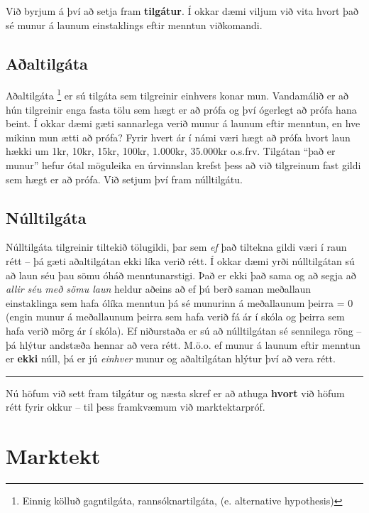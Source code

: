 \documentclass[
]{book}
\theoremstyle{definition}
\theoremstyle{definition}
\theoremstyle{definition}
\theoremstyle{definition}
\theoremstyle{remark}
\begin{document}
Við byrjum á því að setja fram \textbf{tilgátur}. Í okkar dæmi viljum við vita hvort það sé munur á launum einstaklings eftir menntun viðkomandi.

\hypertarget{auxf0altilguxe1ta}{%
\section{Aðaltilgáta}\label{auxf0altilguxe1ta}}

Aðaltilgáta \footnote{Einnig kölluð gagntilgáta, rannsóknartilgáta, (e. alternative hypothesis)} er sú tilgáta sem tilgreinir einhvers konar mun. Vandamálið er að hún tilgreinir enga fasta tölu sem hægt er að prófa og því ógerlegt að prófa hana beint. Í okkar dæmi gæti sannarlega verið munur á launum eftir menntun, en hve mikinn mun ætti að prófa? Fyrir hvert ár í námi væri hægt að prófa hvort laun hækki um 1kr, 10kr, 15kr, 100kr, 1.000kr, 35.000kr o.s.frv. Tilgátan ``það er munur'' hefur ótal möguleika en úrvinnslan krefst þess að við tilgreinum fast gildi sem hægt er að prófa. Við setjum því fram núlltilgátu.

\hypertarget{nuxfalltilguxe1ta}{%
\section{Núlltilgáta}\label{nuxfalltilguxe1ta}}

Núlltilgáta tilgreinir tiltekið tölugildi, þar sem \emph{ef} það tiltekna gildi væri í raun rétt -- þá gæti aðaltilgátan ekki líka verið rétt. Í okkar dæmi yrði núlltilgátan sú að laun séu þau sömu óháð menntunarstigi. Það er ekki það sama og að segja að \emph{allir séu með sömu laun} heldur aðeins að ef þú berð saman meðallaun einstaklinga sem hafa ólíka menntun þá sé munurinn á meðallaunum þeirra = 0 (engin munur á meðallaunum þeirra sem hafa verið fá ár í skóla og þeirra sem hafa verið mörg ár í skóla). Ef niðurstaða er sú að núlltilgátan sé sennilega röng -- þá hlýtur andstæða hennar að vera rétt. M.ö.o. ef munur á launum eftir menntun er \textbf{ekki} núll, þá er jú \emph{einhver} munur
og aðaltilgátan hlýtur því að vera rétt.

\begin{center}\rule{0.5\linewidth}{0.5pt}\end{center}

Nú höfum við sett fram tilgátur og næsta skref er að athuga \textbf{hvort} við höfum rétt fyrir okkur -- til þess framkvæmum við marktektarpróf.

\hypertarget{marktekt}{%
\chapter{Marktekt}\label{marktekt}}
\end{document}
